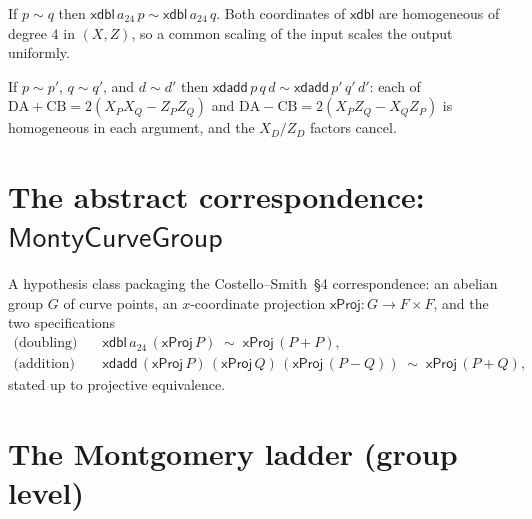 \begin{theorem}
  \label{thm:xdbl-projequiv}
  \leanok
  If $p \sim q$ then $\mathsf{xdbl}\,a_{24}\,p \sim \mathsf{xdbl}\,a_{24}\,q$.
  Both coordinates of $\mathsf{xdbl}$ are homogeneous of degree $4$ in
  $(X,Z)$, so a common scaling of the input scales the output uniformly.
\end{theorem}

\begin{theorem}
  \label{thm:xdadd-projequiv}
  \leanok
  If $p \sim p'$, $q \sim q'$, and $d \sim d'$ then
  $\mathsf{xdadd}\,p\,q\,d \sim \mathsf{xdadd}\,p'\,q'\,d'$: each of
  $\mathrm{DA}+\mathrm{CB} = 2(X_P X_Q - Z_P Z_Q)$ and
  $\mathrm{DA}-\mathrm{CB} = 2(X_P Z_Q - X_Q Z_P)$ is homogeneous in each
  argument, and the $X_D/Z_D$ factors cancel.
\end{theorem}

\section{The abstract correspondence: \texorpdfstring{$\mathsf{MontyCurveGroup}$}{MontyCurveGroup}}

\begin{definition}
  \label{def:monty-curve-group}
  \leanok
  A hypothesis class packaging the Costello--Smith~\S4 correspondence: an
  abelian group $G$ of curve points, an $x$-coordinate projection
  $\mathsf{xProj} : G \to F \times F$, and the two specifications
  \begin{align*}
    \text{(doubling)}\quad&\mathsf{xdbl}\,a_{24}\,(\mathsf{xProj}\,P)
      \;\sim\; \mathsf{xProj}\,(P+P), \\
    \text{(addition)}\quad&\mathsf{xdadd}\,(\mathsf{xProj}\,P)\,
      (\mathsf{xProj}\,Q)\,(\mathsf{xProj}\,(P-Q))
      \;\sim\; \mathsf{xProj}\,(P+Q),
  \end{align*}
  stated up to projective equivalence.
\end{definition}

\section{The Montgomery ladder (group level)}

